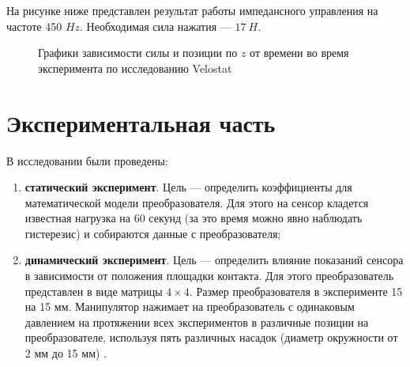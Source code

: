 На рисунке ниже  представлен результат работы импедансного управления на частоте 450 $Hz$. Необходимая сила нажатия --- $17\ H$.
\begin{figure}[h]
        \centering
        \caption{Графики зависимости силы и позиции по $z$ от времени во время эксперимента по исследованию Velostat}
        \label{fig:force_data_pos.png}
    \end{figure}

\section{Экспериментальная часть}

В исследовании были проведены:
\begin{enumerate}
    \item \textbf{статический эксперимент}. Цель — определить коэффициенты для математической модели преобразователя. Для этого на сенсор кладется известная нагрузка на 60 секунд (за это время можно явно наблюдать гистерезис) и собираются данные с преобразователя;
          \item\textbf{динамический эксперимент}. Цель — определить влияние показаний сенсора в зависимости от положения площадки контакта. Для этого преобразователь представлен в виде матрицы $4 \times 4$. Размер преобразователя в эксперименте 15 на 15 мм. Манипулятор нажимает на преобразователь с одинаковым давлением на протяжении всех экспериментов в различные позиции на преобразователе, используя пять различных насадок (диаметр окружности от 2 мм до 15 мм) .
\end{enumerate}


